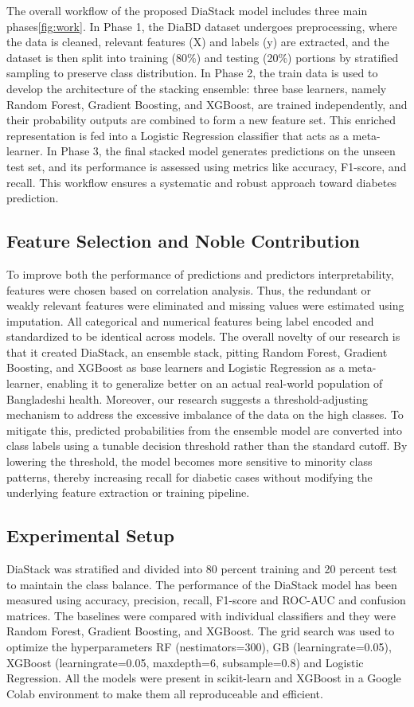 \documentclass[conference, letterpaper]{IEEEtran}
\begin{document}
The overall workflow of the proposed DiaStack model includes three main phases\ref{fig:work}. In Phase 1, the DiaBD dataset undergoes preprocessing, where the data is cleaned, relevant features (X) and labels (y) are extracted, and the dataset is then split into training (80\%) and testing (20\%) portions by stratified sampling to preserve class distribution. In Phase 2, the train data is used to develop the architecture of the stacking ensemble: three base learners, namely Random Forest, Gradient Boosting, and XGBoost, are trained independently, and their probability outputs are combined to form a new feature set. This enriched representation is fed into a Logistic Regression classifier that acts as a meta-learner. In Phase 3, the final stacked model generates predictions on the unseen test set, and its performance is assessed using metrics like accuracy, F1-score, and recall. This workflow ensures a systematic and robust approach toward diabetes prediction.
\subsection{Feature Selection and Noble Contribution }
To improve both the performance of predictions and predictors interpretability, features were chosen based on correlation analysis. Thus, the redundant or weakly relevant features were eliminated and missing values were estimated using imputation. All categorical and numerical features being label encoded and standardized to be identical across models. The overall novelty of our research is that it created DiaStack, an ensemble stack, pitting Random Forest, Gradient Boosting, and XGBoost as base learners and Logistic Regression as a meta-learner, enabling it to generalize better on an actual real-world population of Bangladeshi health. Moreover, our research suggests a threshold-adjusting mechanism to address the excessive imbalance of the data on the high classes. To mitigate this, predicted probabilities from the ensemble model are converted into class labels using a tunable decision threshold rather than the standard cutoff. By lowering the threshold, the model becomes more sensitive to minority class patterns, thereby increasing recall for diabetic cases without modifying the underlying feature extraction or training pipeline. 
\subsection{Experimental Setup}
DiaStack was stratified and divided into 80 percent training and 20 percent test to maintain the class balance. The performance of the DiaStack model has been measured using accuracy, precision, recall, F1-score and ROC-AUC and confusion matrices. The baselines were compared with individual classifiers and they were Random Forest, Gradient Boosting, and XGBoost. The grid search was used to optimize the hyperparameters RF (nestimators=300), GB (learningrate=0.05), XGBoost (learningrate=0.05, maxdepth=6, subsample=0.8) and Logistic Regression. All the models were present in scikit-learn and XGBoost in a Google Colab environment to make them all reproduceable and efficient.
\end{document}
